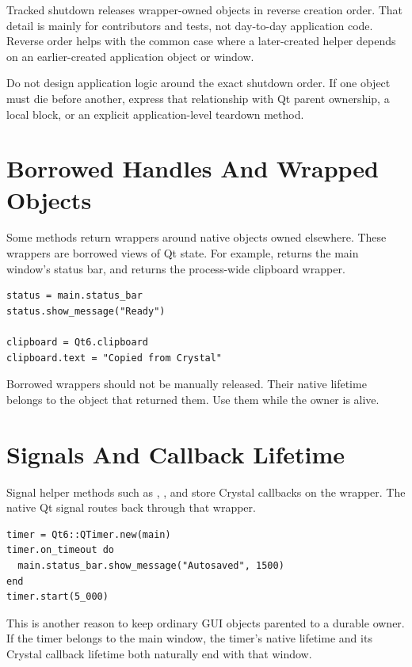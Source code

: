 Tracked shutdown releases wrapper-owned objects in reverse creation order. That detail is mainly for contributors and tests, not day-to-day application code. Reverse order helps with the common case where a later-created helper depends on an earlier-created application object or window.

Do not design application logic around the exact shutdown order. If one object must die before another, express that relationship with Qt parent ownership, a local  block, or an explicit application-level teardown method.

\section{Borrowed Handles And Wrapped Objects}

Some methods return wrappers around native objects owned elsewhere. These wrappers are borrowed views of Qt state. For example,  returns the main window's status bar, and  returns the process-wide clipboard wrapper.

\begin{lstlisting}[style=crystal]
status = main.status_bar
status.show_message("Ready")

clipboard = Qt6.clipboard
clipboard.text = "Copied from Crystal"
\end{lstlisting}

Borrowed wrappers should not be manually released. Their native lifetime belongs to the object that returned them. Use them while the owner is alive.

\section{Signals And Callback Lifetime}

Signal helper methods such as , , and  store Crystal callbacks on the wrapper. The native Qt signal routes back through that wrapper.

\begin{lstlisting}[style=crystal]
timer = Qt6::QTimer.new(main)
timer.on_timeout do
  main.status_bar.show_message("Autosaved", 1500)
end
timer.start(5_000)
\end{lstlisting}

This is another reason to keep ordinary GUI objects parented to a durable owner. If the timer belongs to the main window, the timer's native lifetime and its Crystal callback lifetime both naturally end with that window.

